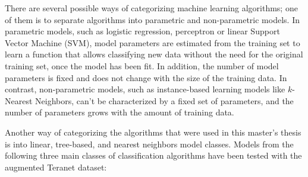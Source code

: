 There are several possible ways of categorizing machine learning algorithms;
one of them is to separate algorithms into parametric and non-parametric models.
In parametric models, such as logistic regression, perceptron or linear Support Vector Machine (SVM), model parameters are estimated from the training set to learn a function that allows classifying new data without the need for the original training set, once the model has been fit.
In addition, the number of model parameters is fixed and does not change with the size of the training data.
In contrast, non-parametric models, such as instance-based learning models like $k$-Nearest Neighbors, can't be characterized by a fixed set of parameters, and the number of parameters grows with the amount of training data.

Another way of categorizing the algorithms that were used in this master's thesis is into linear, tree-based, and nearest neighbors model classes.
Models from the following three main classes of classification algorithms have been tested with the augmented Teranet dataset:

